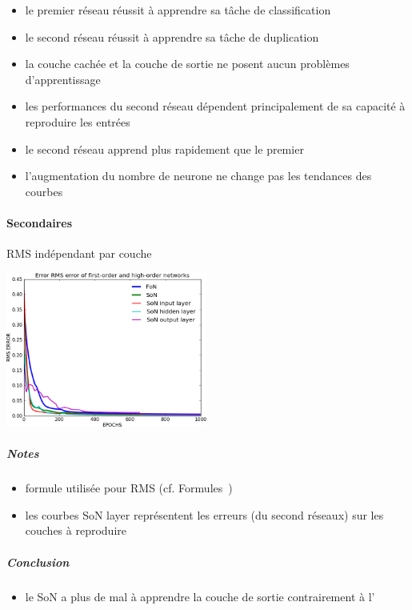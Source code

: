 	\begin{itemize}
	  \item le premier réseau réussit à apprendre sa tâche de classification
	  \item le second réseau réussit à apprendre sa tâche de duplication
	  \item la couche cachée et la couche de sortie ne posent aucun problèmes d'apprentissage
	  \item les performances du second réseau dépendent principalement de sa capacité à reproduire les entrées
	  \item le second réseau apprend plus rapidement que le premier
	  \item l'augmentation du nombre de neurone ne change pas les tendances des courbes
	\end{itemize}
    \paragraph{Secondaires}
      RMS indépendant par couche
      \begin{center}
	\includegraphics[width=250px]{data/expA2/rms_new.png}
      \end{center}
      \subparagraph{Notes}
	\begin{itemize}
	  \item formule utilisée pour RMS (cf. Formules~)
	  \item les courbes SoN layer représentent les erreurs (du second réseaux) sur les couches à reproduire
	\end{itemize}
      \subparagraph{Conclusion}
	\begin{itemize}
	  \item le SoN a plus de mal à apprendre la couche de sortie contrairement à l'
	\end{itemize}
	
